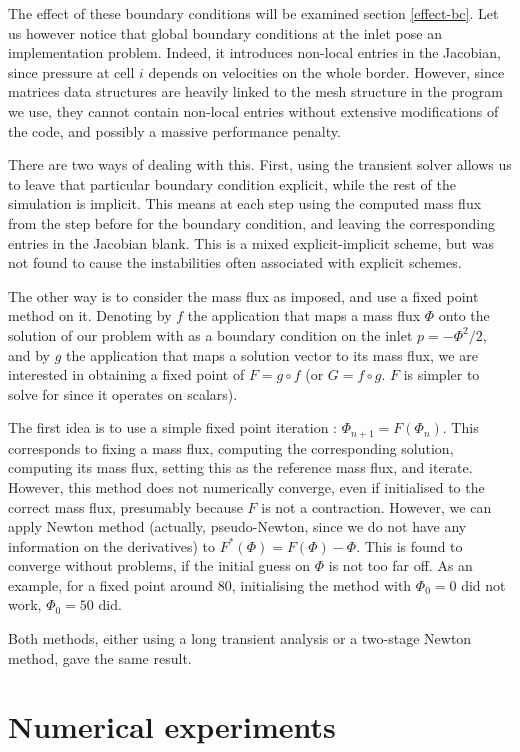 \documentclass[12pt]{article}
\begin{document}
The effect of these boundary conditions will be examined section
\ref{effect-bc}. Let us however notice that global boundary conditions
at the inlet pose an implementation problem. Indeed, it introduces
non-local entries in the Jacobian, since pressure at cell $i$ depends
on velocities on the whole border. However, since matrices data
structures are heavily linked to the mesh structure in the program we
use, they cannot contain non-local entries without extensive
modifications of the code, and possibly a massive performance penalty.

There are two ways of dealing with this. First, using the transient
solver allows us to leave that particular boundary condition explicit,
while the rest of the simulation is implicit. This means at each step
using the computed mass flux from the step before for the boundary
condition, and leaving the corresponding entries in the Jacobian
blank. This is a mixed explicit-implicit scheme, but was not found to
cause the instabilities often associated with explicit schemes.

The other way is to consider the mass flux as imposed, and use a fixed
point method on it. Denoting by $f$ the application that maps a mass
flux $\Phi$ onto the solution of our problem with as a boundary
condition on the inlet $p = - \Phi^{2}/2$, and by $g$ the application
that maps a solution vector to its mass flux, we are interested in
obtaining a fixed point of $F = g \circ f$ (or $G = f \circ g$. $F$ is
simpler to solve for since it operates on scalars).

The first idea is to use a simple fixed point iteration : $\Phi_{n+1} =
F(\Phi_{n})$. This corresponds to fixing a mass flux, computing the
corresponding solution, computing its mass flux, setting this as the
reference mass flux, and iterate. However, this method does not
numerically converge, even if initialised to the correct mass flux,
presumably because $F$ is not a contraction. However, we can apply
Newton method (actually, pseudo-Newton, since we do not have any
information on the derivatives) to $F^{*}(\Phi) = F(\Phi) -
\Phi$. This is found to converge without problems, if the initial
guess on $\Phi$ is not too far off. As an example, for a fixed point
around $80$, initialising the method with $\Phi_{0} = 0$ did not work,
$\Phi_{0} = 50$ did.

Both methods, either using a long transient analysis or a two-stage
Newton method, gave the same result.

\section{Numerical experiments}
\end{document}
